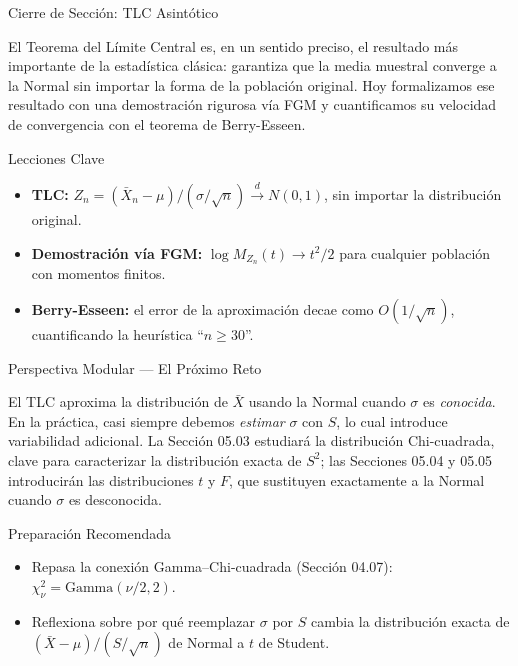 \documentclass[10pt, aspectratio=169]{beamer}
\begin{document}
\begin{frame}{Cierre de Sección: TLC Asintótico}
  \begin{reflexion}
    El Teorema del Límite Central es, en un sentido preciso, el resultado más importante de la estadística clásica: garantiza que la media muestral converge a la Normal sin importar la forma de la población original. Hoy formalizamos ese resultado con una demostración rigurosa vía FGM y cuantificamos su velocidad de convergencia con el teorema de Berry-Esseen.
  \end{reflexion}

  \vspace{0.2cm}
  \pause
  \begin{block}{Lecciones Clave}
    \begin{itemize}\itemsep=0.08cm
      \item \textbf{TLC:} $Z_n = (\bar{X}_n-\mu)/(\sigma/\sqrt{n}) \xrightarrow{d} N(0,1)$, sin importar la distribución original.
      \item \textbf{Demostración vía FGM:} $\log M_{Z_n}(t) \to t^2/2$ para cualquier población con momentos finitos.
      \item \textbf{Berry-Esseen:} el error de la aproximación decae como $O(1/\sqrt{n})$, cuantificando la heurística ``$n\ge30$''.
    \end{itemize}
  \end{block}
\end{frame}

\begin{frame}{Perspectiva Modular --- El Próximo Reto}
  \scriptsize
  \begin{retoclase}
    El TLC aproxima la distribución de $\bar{X}$ usando la Normal cuando $\sigma$ es \emph{conocida}. En la práctica, casi siempre debemos \emph{estimar} $\sigma$ con $S$, lo cual introduce variabilidad adicional. La Sección 05.03 estudiará la distribución Chi-cuadrada, clave para caracterizar la distribución exacta de $S^2$; las Secciones 05.04 y 05.05 introducirán las distribuciones $t$ y $F$, que sustituyen exactamente a la Normal cuando $\sigma$ es desconocida.
  \end{retoclase}

  \vspace{0.08cm}
  \pause
  \begin{alertblock}{Preparación Recomendada}
    \begin{itemize}\itemsep=0.06cm
      \item Repasa la conexión Gamma--Chi-cuadrada (Sección 04.07): $\chi^2_\nu = \text{Gamma}(\nu/2, 2)$.
      \item Reflexiona sobre por qué reemplazar $\sigma$ por $S$ cambia la distribución exacta de $(\bar X-\mu)/(S/\sqrt n)$ de Normal a $t$ de Student.
    \end{itemize}
  \end{alertblock}
\end{frame}
\end{document}
